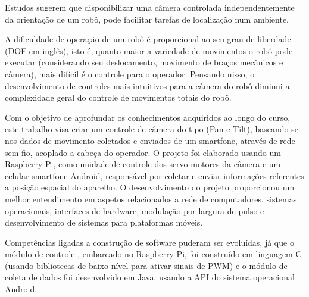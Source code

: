 Estudos sugerem que disponibilizar uma câmera controlada independentemente da orientação de um robô, pode facilitar tarefas de localização num ambiente. 

A dificuldade de operação de um robô é proporcional ao seu grau de liberdade (DOF em inglês), isto é, quanto maior a variedade de movimentos o robô pode executar (considerando seu deslocamento, movimento de braços mecânicos e câmera), mais difícil é o controle para o operador.
Pensando nisso, o desenvolvimento de controles mais intuitivos para a câmera do robô diminui a complexidade geral do controle de movimentos totais do robô. \par

Com o objetivo de aprofundar os conhecimentos adquiridos ao longo do curso, este trabalho visa criar um controle de câmera do tipo (Pan e Tilt), baseando-se nos dados de movimento coletados e enviados de um smartfone, através de rede sem fio, acoplado a cabeça do operador. O projeto foi elaborado usando um Raspberry Pi, como unidade de controle dos servo motores da câmera e um celular smartfone Android, responsável por coletar e enviar informações referentes a posição espacial do aparelho. O desenvolvimento do projeto proporcionou um melhor entendimento em aspetos relacionados a rede de computadores, sistemas operacionais, interfaces de hardware, modulação por largura de pulso e desenvolvimento de sistemas para plataformas móveis.\par

Competências ligadas a construção de software puderam ser evoluídas, já que o módulo de controle , embarcado no Raspberry Pi, foi construído em linguagem C (usando bibliotecas de baixo nível para ativar sinais de PWM) e o módulo de coleta de dados foi desenvolvido em Java, usando a API do sistema operacional Android.

